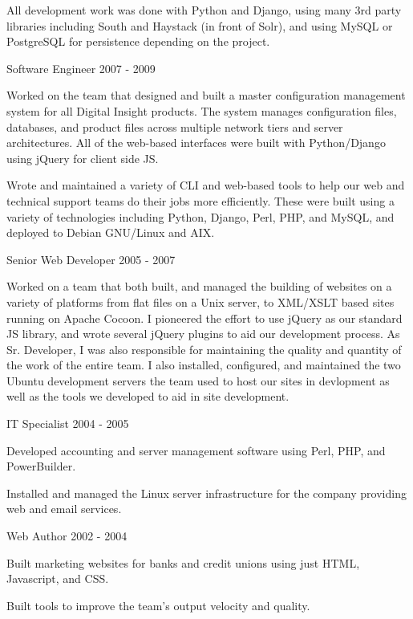 \documentclass[11pt]{article} %
\begin{document}
\begin{description}
\item All development work was done with Python and Django, using many 3rd party libraries including South and Haystack
(in front of Solr), and using MySQL or PostgreSQL for persistence depending on the project.

           {Software Engineer}
           {2007 - 2009}

\item Worked on the team that designed and built a master configuration management system for all Digital Insight products.
The system manages configuration files, databases, and product files across multiple network tiers and server architectures.
All of the web-based interfaces were built with Python/Django using jQuery for client side JS.

\item Wrote and maintained a variety of CLI and web-based tools to help our web and technical support teams do their jobs more efficiently.
These were built using a variety of technologies including Python, Django, Perl, PHP, and MySQL, and deployed to Debian GNU/Linux and AIX.

           {Senior Web Developer}
           {2005 - 2007}

\item Worked on a team that both built, and managed the building of websites on a variety of platforms from flat files on a Unix server,
to XML/XSLT based sites running on Apache Cocoon. I pioneered the effort to use jQuery as our standard JS library,
and wrote several jQuery plugins to aid our development process. As Sr. Developer, I was also responsible for
maintaining the quality and quantity of the work of the entire team. I also installed, configured, and maintained
the two Ubuntu development servers the team used to host our sites in devlopment as well as the tools we developed
to aid in site development.

           {IT Specialist}
           {2004 - 2005}

\item Developed accounting and server management software using Perl, PHP, and PowerBuilder.

\item Installed and managed the Linux server infrastructure for the company providing web and email services.

           {Web Author}
           {2002 - 2004}

\item Built marketing websites for banks and credit unions using just HTML, Javascript, and CSS.

\item Built tools to improve the team's output velocity and quality.

\end{description}
\end{document}
